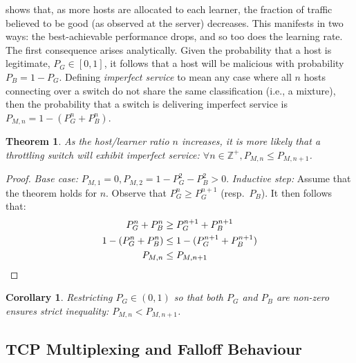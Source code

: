 \documentclass[conference, a4paper, 10pt, times]{IEEEtran}
\newtheorem{thm}{Theorem}
\newtheorem{corr}{Corollary}[thm]
\begin{document}
 shows that, as more hosts are allocated to each learner, the fraction of traffic believed to be good (as observed at the server) decreases.
This manifests in two ways: the best-achievable performance drops, and so too does the learning rate.
The first consequence arises analytically.
Given the probability that a host is legitimate, $P_G \in [0,1]$, it follows that a host will be malicious with probability $P_B = 1 - P_G$.
Defining \emph{imperfect service} to mean any case where all $n$ hosts connecting over a switch do not share the same classification (i.e., a mixture), then the probability that a switch is delivering imperfect service is $P_{M,n} = 1 - (P_G^n + P_B^n)$.
\begin{thm}
	As the host/learner ratio $n$ increases, it is more likely that a throttling switch will exhibit imperfect service: $\forall n \in \mathbb{Z}^{+}, P_{M,n} \le P_{M,n+1}$.
\end{thm}
\begin{proof}
	\emph{Base case:} $P_{M,1}=0, P_{M,2} = 1 - P_G^2 - P_B^2 > 0$.
	\emph{Inductive step:} Assume that the theorem holds for $n$. Observe that $P_G^n \ge P_G^{n+1}$ (resp.\ $P_B$). It then follows that:
	\begin{align*}
	P_G^n + P_B^n &\ge P_G^{n+1} + P_B^{n+1}\\
	1 - (P_G^n + P_B^n) &\le 1 - (P_G^{n+1} + P_B^{n+1})\\
	P_{M,n} &\le P_{M,n+1} \qedhere
	\end{align*}
\end{proof}
\begin{corr}
	Restricting $P_G \in (0,1)$ so that both $P_G$ and $P_B$ are non-zero ensures strict inequality: $P_{M,n} < P_{M,n+1}$.
\end{corr}


\subsection{TCP Multiplexing and Falloff Behaviour}\label{sec:tcp-multiplexing-and-fallback-behaviour}

\end{document}
